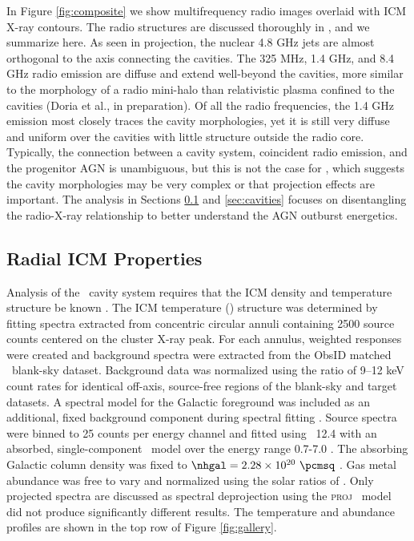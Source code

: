 \documentclass[11pt, preprint]{aastex}
\begin{document}
In Figure \ref{fig:composite} we show multifrequency radio images
overlaid with ICM X-ray contours. The radio structures are discussed
thoroughly in \citet{gitti06}, and we summarize here. As seen in
projection, the nuclear 4.8 GHz jets are almost orthogonal to the axis
connecting the cavities. The 325 MHz, 1.4 GHz, and 8.4 GHz radio
emission are diffuse and extend well-beyond the cavities, more similar
to the morphology of a radio mini-halo than relativistic plasma
confined to the cavities (Doria et al., in preparation). Of all the
radio frequencies, the 1.4 GHz emission most closely traces the cavity
morphologies, yet it is still very diffuse and uniform over the
cavities with little structure outside the radio core. Typically, the
connection between a cavity system, coincident radio emission, and the
progenitor AGN is unambiguous, but this is not the case for \rbs,
which suggests the cavity morphologies may be very complex or that
projection effects are important. The analysis in Sections
\ref{sec:icm} and \ref{sec:cavities} focuses on disentangling the
radio-X-ray relationship to better understand the AGN outburst
energetics.

\subsection{Radial ICM Properties}
\label{sec:icm}

Analysis of the \rbs\ cavity system requires that the ICM density and
temperature structure be known \citep[see][for details]{mcnamrev}. The
ICM temperature (\tx) structure was determined by fitting spectra
extracted from concentric circular annuli containing 2500 source
counts centered on the cluster X-ray peak. For each annulus, weighted
responses were created and background spectra were extracted from the
ObsID matched \caldb\ blank-sky dataset. Background data was
normalized using the ratio of 9--12 keV count rates for identical
off-axis, source-free regions of the blank-sky and target datasets. A
spectral model for the Galactic foreground was included as an
additional, fixed background component during spectral fitting
\citep{2005ApJ...628..655V, xrayband}. Source spectra were binned to
25 counts per energy channel and fitted using \xspec\ 12.4
\citep{xspec} with an absorbed, single-component \mekal\ model
\citep{mekal1} over the energy range 0.7-7.0 \keV. The absorbing
Galactic column density was fixed to $\nhgal = 2.28 \times 10^{20}
~\pcmsq$ \citep{lab}. Gas metal abundance was free to vary and
normalized using the solar ratios of \citet{ag89}. Only projected
spectra are discussed as spectral deprojection using the
{\textsc{proj}} \xspec\ model did not produce significantly different
results. The temperature and abundance profiles are shown in the top
row of Figure \ref{fig:gallery}.
\end{document}
